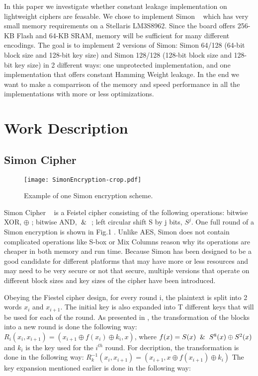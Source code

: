 \documentclass[conference]{IEEEtran}
\begin{document}
In this paper we investigate whether constant leakage implementation on lightweight ciphers are feasable. We chose to implement Simon ~\cite{Beaulieu_Simon} which has very small memory requirements on a Stellaris LM3S8962. Since the board offers 256-KB Flash and 64-KB SRAM, memory will be sufficient for many different encodings. The goal is to implement 2 versions of Simon: Simon 64/128 (64-bit block size and 128-bit key size) and Simon 128/128 (128-bit block size and 128-bit key size) in 2 different ways: one unprotected implementation, and one implementation that offers constant Hamming Weight leakage. In the end we want to make a comparrison of the memory and speed performance in all the implementations with more or less optimizations.

\section{Work Description}

\subsection{Simon Cipher}

\begin{figure}[htbp]
  \centering
  \texttt{[image: SimonEncryption-crop.pdf]}
  \caption{Example of one Simon encryption scheme.} 
  \label{fig:simon}
\end{figure}

Simon Cipher ~\cite{Beaulieu_Simon} is a Feistel cipher consisting of the following operations: bitwise XOR, $\oplus$ ; bitwise AND, $\And$ ; left circular shift S by j bits, $S^j$. One full round of a Simon encryption is shown in Fig.1 . Unlike AES, Simon does not contain complicated operations like S-box or Mix Columns reason why its operations are cheaper in both memory and run time. Because Simon has been designed to be a good candidate for different platforms that may have more or less resources and may need to be very secure or not that secure, multiple versions that operate on different block sizes and key sizes of the cipher have been introduced.

Obeying the Fiestel cipher design, for every round i, the plaintext is split into 2 words $x_{i}$ and $x_{i+1}$. The initial key is also expanded into T different keys that will be used for each of the round. As presented in \cite{Beaulieu_Simon} , the transformation of the blocks into a new round is done the following way:
$R_{i}(x_{i}, x_{i+1}) = (x_{i+1} \oplus f(x_{i}) \oplus k_{i}, x)$, where
$f(x) = S(x) \And S^{8}(x) \oplus S^{2}(x)$ and $k_{i}$ is the key used for the $i^{th}$ round. For decription, the transformation is done in the following way:
$R_{k}^{-1}(x_{i}, x_{i+1}) = (x_{i+1}, x \oplus f(x_{i+1}) \oplus k_{i})$
The key expansion mentioned earlier is done in the following way:
\end{document}
